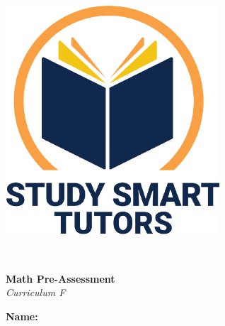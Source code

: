 \documentclass[12pt]{article}
\title{}
\date{}
\begin{document}
\thispagestyle{empty}

\vspace*{\fill}

\vspace*{3cm}

\begin{center}

    \includegraphics[width=0.6\textwidth]{SST_Color_Logo.png} %
    
    \vspace{1cm} %
    
    \Huge \textbf{} \\
    \vspace{0.2cm}
    
    \Huge \textbf{ Math Pre-Assessment}\\
    \LARGE \textit{Curriculum F}\\  
    [2cm]

 \vspace{0.5cm}
    
   


    \LARGE \textbf{Name:} \underline{\hspace{8cm}}
    
    
    \vspace{0.5cm}
    
    \vspace{1cm}
   
    
    \vfill %
    
\end{center}
\end{document}
